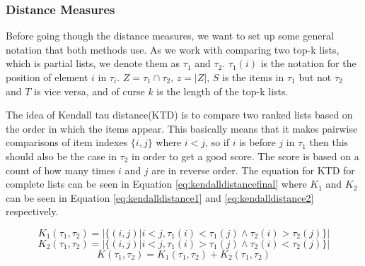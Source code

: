 \subsubsection{Distance Measures}\label{sec:distance}
Before going though the distance measures, we want to set up some general notation that both methods use. As we work with comparing two top-k lists, which is partial lists, we denote them as $\tau_1$ and $\tau_2$. $\tau_1 (i)$ is the notation for the position of element $i$ in $\tau_i$. $Z = \tau_1 \cap \tau_2$, $z=|Z|$, $S$ is the items in $\tau_1$ but not $\tau_2$ and $T$ is vice versa, and of curse $k$ is the length of the top-k lists. 

The idea of Kendall tau distance(KTD) is to compare two ranked lists based on the order in which the items appear. This basically means that it makes pairwise comparisons of item indexes $\{i,j\}$ where $i < j$, so if $i$ is before $j$ in $\tau_1$ then this should also be the case in $\tau_2$ in order to get a good score. The score is based on a count of how many times $i$ and $j$ are in reverse order. The equation for KTD for complete lists can be seen in Equation \ref{eq:kendalldistancefinal} where $K_1$ and $K_2$ can be seen in Equation \ref{eq:kendalldistance1} and \ref{eq:kendalldistance2} respectively.

\begin{equation}\label{eq:kendalldistance1}
K_1(\tau_1,\tau_2) = | \{(i,j) | i < j, \tau_1 (i) < \tau_1 (j) \land \tau_2 (i) > \tau_2 (j)\}|
\end{equation}
\begin{equation}\label{eq:kendalldistance2}
K_2(\tau_1,\tau_2) = | \{(i,j) | i < j, \tau_1 (i) > \tau_1 (j) \land \tau_2 (i) < \tau_2 (j) \} |
\end{equation}
\begin{equation}\label{eq:kendalldistancefinal}
K(\tau_1,\tau_2) = K_1(\tau_1,\tau_2) + K_2(\tau_1,\tau_2)
\end{equation}

